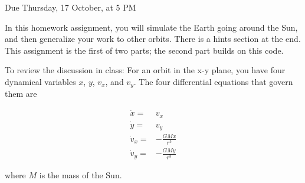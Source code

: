 \documentclass[12pt]{article}
\begin{document}
\Large
\centerline{}
\centerline{Due Thursday, 17 October, at 5 PM}
\normalsize

In this homework assignment, you will simulate the Earth going around the Sun,
and then generalize your work to other orbits. There is a hints section at the end. This assignment is the first 
of two parts; the second part builds on this code.

To review the discussion in class: 
For an orbit in the x-y plane, you have four dynamical variables $x$, $y$,
$v_x$, and $v_y$. The four differential equations that govern them are

\begin{align}
\dot x =& v_x\\
\dot y =& v_y\\
\dot v_x =& -\frac{GMx}{r^3} \\
\dot v_y =& -\frac{GMy}{r^3} 
\end{align}

where $M$ is the mass of the Sun.
\end{document}
